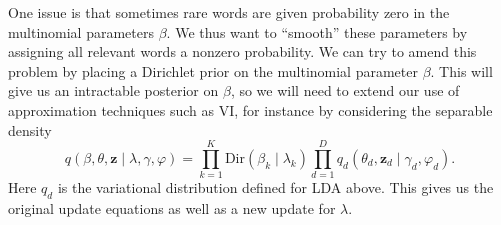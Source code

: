 One issue is that sometimes rare words are given probability zero in the multinomial parameters $\beta$. We thus want to ``smooth'' these parameters by assigning all relevant words a nonzero probability. We can try to amend this problem by placing a Dirichlet prior on the multinomial parameter $\beta$. This will give us an intractable posterior on $\beta$, so we will need to extend our use of approximation techniques such as VI, for instance by considering the separable density
\[
q(\beta, \theta, \mathbf{z}\mid \lambda, \gamma, \varphi) = \prod\limits_{k=1}^{K} \text{Dir}(\beta_k\mid \lambda_k) \prod\limits_{d=1}^{D} q_d(\theta_d, \mathbf{z}_d \mid \gamma_d, \varphi_d).
\]
Here $q_d$ is the variational distribution defined for LDA above. This gives us the original update equations as well as a new update for $\lambda$.
